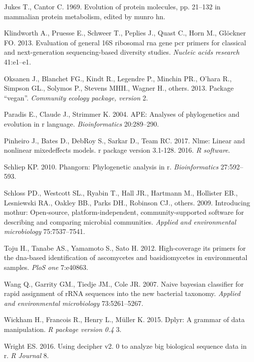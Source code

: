\documentclass[11pt,]{article}
\begin{document}
\hypertarget{ref-jukes1969evolution}{}
Jukes T., Cantor C. 1969. Evolution of protein molecules, pp. 21--132 in
mammalian protein metabolism, edited by munro hn.

\hypertarget{ref-klindworth2013evaluation}{}
Klindworth A., Pruesse E., Schweer T., Peplies J., Quast C., Horn M.,
Glöckner FO. 2013. Evaluation of general 16S ribosomal rna gene pcr
primers for classical and next-generation sequencing-based diversity
studies. \emph{Nucleic acids research} 41:e1--e1.

\hypertarget{ref-oksanen2013package}{}
Oksanen J., Blanchet FG., Kindt R., Legendre P., Minchin PR., O'hara R.,
Simpson GL., Solymos P., Stevens MHH., Wagner H., others. 2013. Package
``vegan''. \emph{Community ecology package, version} 2.

\hypertarget{ref-paradis2004ape}{}
Paradis E., Claude J., Strimmer K. 2004. APE: Analyses of phylogenetics
and evolution in r language. \emph{Bioinformatics} 20:289--290.

\hypertarget{ref-pinheiro2017nlme}{}
Pinheiro J., Bates D., DebRoy S., Sarkar D., Team RC. 2017. Nlme: Linear
and nonlinear mixedeffects models. r package version 3.1-128. 2016.
\emph{R software}.

\hypertarget{ref-schliep2010phangorn}{}
Schliep KP. 2010. Phangorn: Phylogenetic analysis in r.
\emph{Bioinformatics} 27:592--593.

\hypertarget{ref-schloss2009introducing}{}
Schloss PD., Westcott SL., Ryabin T., Hall JR., Hartmann M., Hollister
EB., Lesniewski RA., Oakley BB., Parks DH., Robinson CJ., others. 2009.
Introducing mothur: Open-source, platform-independent,
community-supported software for describing and comparing microbial
communities. \emph{Applied and environmental microbiology}
75:7537--7541.

\hypertarget{ref-toju2012high}{}
Toju H., Tanabe AS., Yamamoto S., Sato H. 2012. High-coverage its
primers for the dna-based identification of ascomycetes and
basidiomycetes in environmental samples. \emph{PloS one} 7:e40863.

\hypertarget{ref-wang2007naive}{}
Wang Q., Garrity GM., Tiedje JM., Cole JR. 2007. Naive bayesian
classifier for rapid assignment of rRNA sequences into the new bacterial
taxonomy. \emph{Applied and environmental microbiology} 73:5261--5267.

\hypertarget{ref-wickham2015dplyr}{}
Wickham H., Francois R., Henry L., Müller K. 2015. Dplyr: A grammar of
data manipulation. \emph{R package version 0.4} 3.

\hypertarget{ref-wright2016using}{}
Wright ES. 2016. Using decipher v2. 0 to analyze big biological sequence
data in r. \emph{R Journal} 8.
\end{document}
